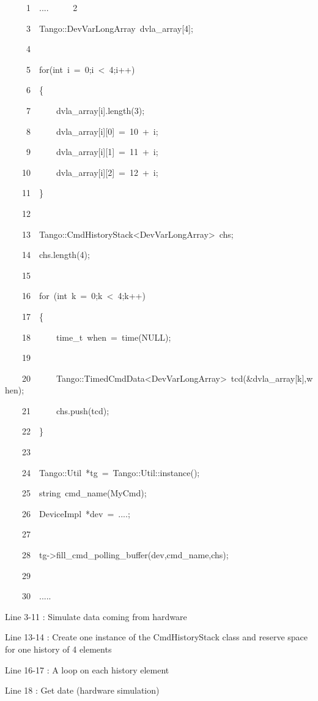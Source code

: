 \begin{lyxcode}
~~~~~1~~....
~~~~~2~~

~~~~~3~~Tango::DevVarLongArray~dvla\_array{[}4{]};

~~~~~4~~~~~~~~~~

~~~~~5~~for(int~i~=~0;i~<~4;i++)

~~~~~6~~\{

~~~~~7~~~~~~dvla\_array{[}i{]}.length(3);

~~~~~8~~~~~~dvla\_array{[}i{]}{[}0{]}~=~10~+~i;

~~~~~9~~~~~~dvla\_array{[}i{]}{[}1{]}~=~11~+~i;

~~~~10~~~~~~dvla\_array{[}i{]}{[}2{]}~=~12~+~i;

~~~~11~~\}

~~~~12~~

~~~~13~~Tango::CmdHistoryStack<DevVarLongArray>~chs;

~~~~14~~chs.length(4);

~~~~15~~

~~~~16~~for~(int~k~=~0;k~<~4;k++)

~~~~17~~\{

~~~~18~~~~~~time\_t~when~=~time(NULL);

~~~~19~~

~~~~20~~~~~~Tango::TimedCmdData<DevVarLongArray>~tcd(\&dvla\_array{[}k{]},when);

~~~~21~~~~~~chs.push(tcd);

~~~~22~~\}

~~~~23~~

~~~~24~~Tango::Util~{*}tg~=~Tango::Util::instance();

~~~~25~~string~cmd\_name(\textquotedbl{}MyCmd\textquotedbl{});

~~~~26~~DeviceImpl~{*}dev~=~....;

~~~~27~~

~~~~28~~tg->fill\_cmd\_polling\_buffer(dev,cmd\_name,chs);

~~~~29~~

~~~~30~~.....

\end{lyxcode}


Line 3-11 : Simulate data coming from hardware

Line 13-14 : Create one instance of the CmdHistoryStack class and
reserve space for one history of 4 elements

Line 16-17 : A loop on each history element

Line 18 : Get date (hardware simulation)

